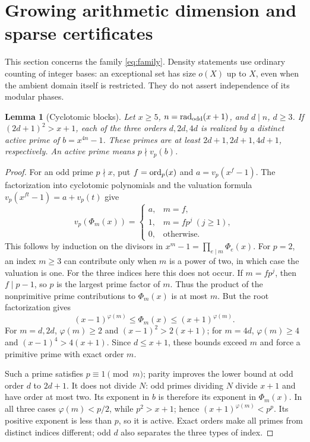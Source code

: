 \documentclass[11pt,a4paper]{article}
\newtheorem{lemma}[theorem]{Lemma}
\theoremstyle{definition}\newtheorem{question}[theorem]{Question}
\theoremstyle{remark}\newtheorem{remark}[theorem]{Remark}
\DeclareMathOperator{\rad}{rad}\DeclareMathOperator{\supp}{supp}
\begin{document}
\section{Growing arithmetic dimension and sparse certificates}\label{sec:growth}
This section concerns the family \eqref{eq:family}. Density statements
use ordinary counting of integer bases: an exceptional set has size
$o(X)$ up to $X$, even when the ambient domain itself is restricted.
They do not assert independence of its modular phases.

\begin{lemma}[Cyclotomic blocks]\label{lem:cyclo}
Let $x\ge5$, $n=\rad_{\rm odd}(x+1)$, and $d\mid n$, $d\ge3$.
If $(2d+1)^2>x+1$, each of the three orders $d,2d,4d$ is realized
by a distinct active prime of $b=x^{4n}-1$. These primes are at least
$2d+1,2d+1,4d+1$, respectively. An active prime means
$p\nmid v_p(b)$.
\end{lemma}
\begin{proof}
For an odd prime $p\nmid x$, put $f=\operatorname{ord}_p(x)$ and
$a=v_p(x^f-1)$. The factorization into cyclotomic polynomials and
the valuation formula $v_p(x^{ft}-1)=a+v_p(t)$ give
\[
 v_p(\Phi_m(x))=
 \begin{cases}a,&m=f,\\1,&m=fp^j\ (j\ge1),\\0,&\text{otherwise}.
 \end{cases}
\]
This follows by induction on the divisors in
$x^m-1=\prod_{e\mid m}\Phi_e(x)$.
For $p=2$, an index $m\ge3$ can contribute only when $m$ is a power
of two, in which case the valuation is one. For the three indices
here this does not occur. If $m=fp^j$, then $f\mid p-1$, so $p$
is the largest prime factor of $m$. Thus the product of the
nonprimitive prime contributions to $\Phi_m(x)$ is at most $m$.
But the root factorization gives
\[
 (x-1)^{\varphi(m)}\le\Phi_m(x)\le(x+1)^{\varphi(m)}.
\]
For $m=d,2d$, $\varphi(m)\ge2$ and $(x-1)^2>2(x+1)$;
for $m=4d$, $\varphi(m)\ge4$ and $(x-1)^4>4(x+1)$.
Since $d\le x+1$, these bounds exceed $m$ and force a primitive
prime with exact order $m$.

Such a prime satisfies $p\equiv1\pmod m$; parity improves the
lower bound at odd order $d$ to $2d+1$. It does not divide $N$:
odd primes dividing $N$ divide $x+1$ and have order at most two.
Its exponent in $b$ is therefore its exponent in $\Phi_m(x)$.
In all three cases $\varphi(m)<p/2$, while $p^2>x+1$; hence
$(x+1)^{\varphi(m)}<p^p$. Its positive exponent is less than $p$,
so it is active. Exact orders make all primes from distinct indices
different; odd $d$ also separates the three types of index.
\end{proof}
\end{document}
